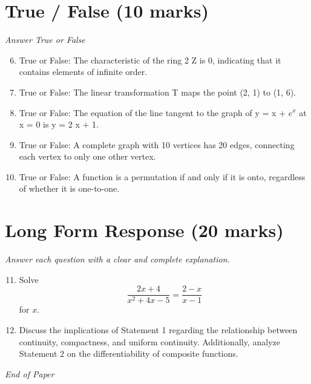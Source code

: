 \documentclass[12pt]{article}
\begin{document}
\section*{True / False (10 marks)}
\textit{Answer True or False}
\begin{enumerate}[label=\arabic*.]
\setcounter{enumi}{5}
\item True or False: The characteristic of the ring 2 Z is 0, indicating that it contains elements of infinite order.
\item True or False: The linear transformation T maps the point (2, 1) to (1, 6).
\item True or False: The equation of the line tangent to the graph of y = x + $e^x$ at x = 0 is y = 2 x + 1.
\item True or False: A complete graph with 10 vertices has 20 edges, connecting each vertex to only one other vertex.
\item True or False: A function is a permutation if and only if it is onto, regardless of whether it is one-to-one.
\end{enumerate}

\section*{Long Form Response (20 marks)}
\textit{Answer each question with a clear and complete explanation.}
\begin{enumerate}[label=\arabic*.]
\setcounter{enumi}{10}
\item Solve \[\frac{2 x+4}{x^2+4 x-5}=\frac{2-x}{x-1}\]for $x$.
\item Discuss the implications of Statement 1 regarding the relationship between continuity, compactness, and uniform continuity. Additionally, analyze Statement 2 on the differentiability of composite functions.
\end{enumerate}

\vfill
\noindent\textit{End of Paper}
\end{document}
